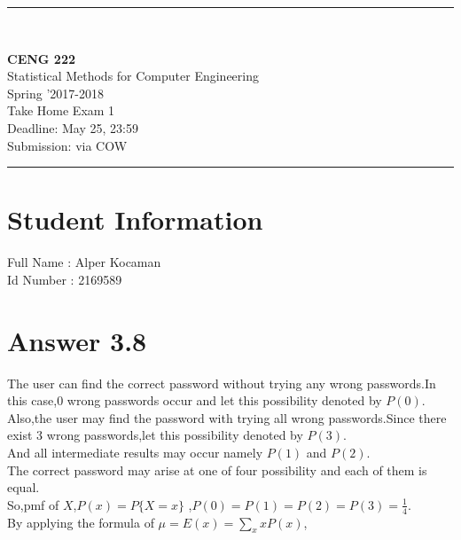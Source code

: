 \documentclass[12pt]{article}
\newcommand{\HRule}{\rule{\linewidth}{1mm}}
\begin{document}
\noindent
\HRule \\[3mm]
\begin{flushright}

                                         \LARGE \textbf{CENG 222}  \\[4mm]
                                         \Large Statistical Methods for Computer Engineering \\[4mm]
                                        \normalsize      Spring '2017-2018 \\
                                           \Large   Take Home Exam 1 \\
                    \normalsize Deadline: May 25, 23:59 \\
                    \normalsize Submission: via COW
\end{flushright}
\HRule

\section*{Student Information }
Full Name : Alper Kocaman\\
Id Number : 2169589 \\

\section*{Answer 3.8}

The user can find the correct password without trying any wrong passwords.In this case,0 wrong passwords occur and let this possibility denoted by $P(0)$.\\
Also,the user may find the password with trying all wrong passwords.Since there exist 3 wrong passwords,let this possibility denoted by $P(3)$.\\
And all intermediate results may occur namely $P(1)$ and $P(2)$.\\

The correct password may arise at one of four possibility and each of them is equal.\\
So,pmf of $X$,$P(x)=P\{X=x\}$ ,$P(0)=P(1)=P(2)=P(3)=\frac{1}{4}$.\\

By applying the formula of $\mu=E(x)=\sum\limits_{x} xP(x)$,\\ 
\end{document}
